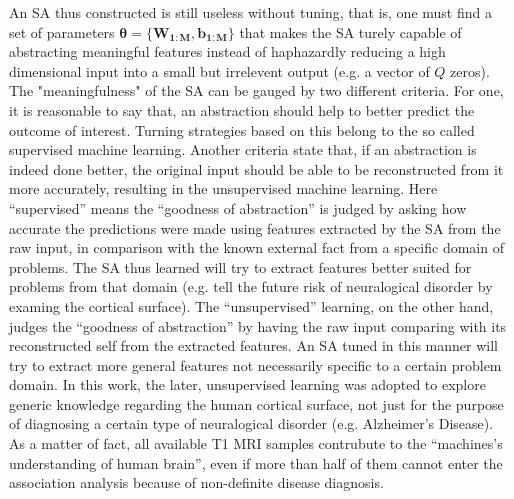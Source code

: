 An SA thus constructed is still useless without tuning, that is, one must find a set of parameters $\boldsymbol{\theta}=\{\boldsymbol{W_{1:M}},\boldsymbol{b_{1:M}}\}$ that makes the SA turely capable of abstracting meaningful features instead of haphazardly reducing a high dimensional input into a small but irrelevent output (e.g. a vector of $Q$ zeros). The "meaningfulness" of the SA can be gauged by two different criteria. For one, it is reasonable to say that, an abstraction should help to better predict the outcome of interest. Turning strategies based on this belong to the so called supervised machine learning. Another criteria state that, if an abstraction is indeed done better, the original input should be able to be reconstructed from it more accurately, resulting in the unsupervised machine learning. Here ``supervised'' means the ``goodness of abstraction'' is judged by asking how accurate the predictions were made using features extracted by the SA from the raw input, in comparison with the known external fact from a specific domain of problems. The SA thus learned will try to extract features better suited for problems from that domain (e.g. tell the future risk of neuralogical disorder by examing the cortical surface). The ``unsupervised'' learning, on the other hand, judges the ``goodness of abstraction'' by having the raw input comparing with its reconstructed self from the extracted features. An SA tuned in this manner will try to extract more general features not necessarily specific to a certain problem domain. In this work, the later, unsupervised learning was adopted to explore generic knowledge regarding the human cortical surface, not just for the purpose of diagnosing a certain type of neuralogical disorder (e.g. Alzheimer's Disease). As a matter of fact, all available T1 MRI samples contrubute to the ``machines's understanding of human brain'', even if more than half of them cannot enter the association analysis because of non-definite disease diagnosis.

